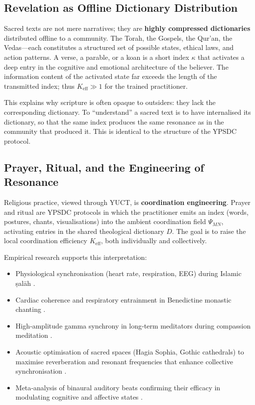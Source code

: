 \documentclass[12pt,a4paper]{article}
\begin{document}
	\subsection{Revelation as Offline Dictionary Distribution}
	
	Sacred texts are not mere narratives; they are \textbf{highly compressed dictionaries} distributed offline to a community. The Torah, the Gospels, the Qur’an, the Vedas—each constitutes a structured set of possible states, ethical laws, and action patterns. A verse, a parable, or a koan is a short index \(\kappa\) that activates a deep entry in the cognitive and emotional architecture of the believer. The information content of the activated state far exceeds the length of the transmitted index; thus \(K_{\mathrm{eff}} \gg 1\) for the trained practitioner.
	
	This explains why scripture is often opaque to outsiders: they lack the corresponding dictionary. To “understand” a sacred text is to have internalised its dictionary, so that the same index produces the same resonance as in the community that produced it. This is identical to the structure of the YPSDC protocol.
	
	\subsection{Prayer, Ritual, and the Engineering of Resonance}
	
	Religious practice, viewed through YUCT, is \textbf{coordination engineering}. Prayer and ritual are YPSDC protocols in which the practitioner emits an index (words, postures, chants, visualisations) into the ambient coordination field \(\Psi_{MN}\), activating entries in the shared theological dictionary \(D\). The goal is to raise the local coordination efficiency \(K_{\mathrm{eff}}\), both individually and collectively.
	
	Empirical research supports this interpretation:
	\begin{itemize}[leftmargin=*]
		\item Physiological synchronisation (heart rate, respiration, EEG) during Islamic ṣalāh \cite{RoyalSociety2024}.
		\item Cardiac coherence and respiratory entrainment in Benedictine monastic chanting \cite{Craswell2023}.
		\item High‑amplitude gamma synchrony in long‑term meditators during compassion meditation \cite{Lutz2017}.
		\item Acoustic optimisation of sacred spaces (Hagia Sophia, Gothic cathedrals) to maximise reverberation and resonant frequencies that enhance collective synchronisation \cite{Pentcheva2020}.
		\item Meta‑analysis of binaural auditory beats confirming their efficacy in modulating cognitive and affective states \cite{Garcia2021}.
	\end{itemize}
	
\end{document}
